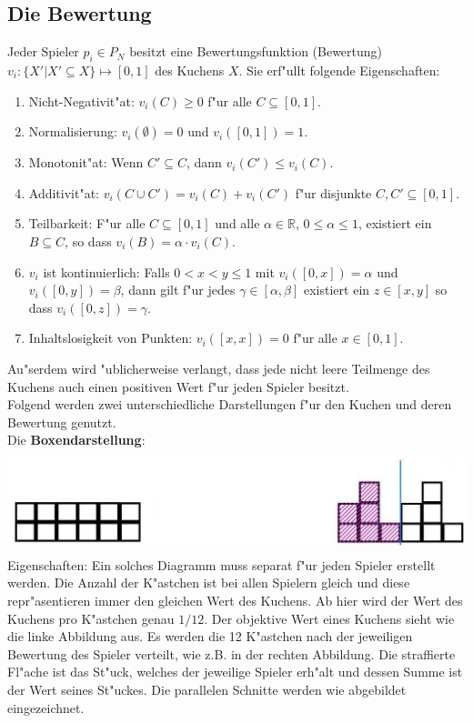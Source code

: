 \documentclass[11pt, a4paper, twoside]{article}
\numberwithin{equation}{section}
\begin{document}
\subsection{Die Bewertung} 
Jeder Spieler $p_i \in P_N$ besitzt eine Bewertungsfunktion (Bewertung) $v_i:\{X'|X'\subseteq X\}\mapsto [0,1]$ des Kuchens $X$. Sie erf"ullt folgende Eigenschaften:
\begin{enumerate}
\item Nicht-Negativit"at: $v_i(C)\geq 0$ f"ur alle $C\subseteq [0,1].$
\item Normalisierung: $v_i(\emptyset)=0$ und $v_i([0,1])=1.$
\item Monotonit"at: Wenn $C' \subseteq C$, dann $v_i(C') \leq v_i(C).$
\item Additivit"at: $v_i(C \cup C')=v_i(C)+v_i(C')$ f"ur disjunkte $C,C'\subseteq [0,1].$
\item Teilbarkeit: F"ur alle $C\subseteq [0,1]$ und alle $\alpha \in \mathbb{R}$, $0\leq \alpha \leq 1$, existiert ein $B\subseteq C$, so dass  $v_i(B)=\alpha \cdot v_i(C).$
\item  $v_i$ ist kontinuierlich: Falls $0<x<y\leq 1$ mit $v_i([0,x])=\alpha$ und $v_i([0,y])=\beta$, dann gilt f"ur jedes $\gamma \in [\alpha,\beta]$ existiert ein $z \in [x,y]$ so dass $v_i([0,z])=\gamma.$
\item Inhaltslosigkeit von Punkten:  $v_i([x,x])=0$ f"ur alle $x\in [0,1].$
\end{enumerate}
Au"serdem wird "ublicherweise verlangt, dass jede nicht leere Teilmenge des Kuchens auch einen positiven Wert f"ur jeden Spieler besitzt.\\
Folgend werden zwei unterschiedliche Darstellungen f"ur den Kuchen und deren Bewertung genutzt.\\
\newline
Die \textbf{Boxendarstellung}:\\
 \includegraphics[height=3cm]{cc1svv.jpg}\\
Eigenschaften: Ein solches Diagramm muss separat f"ur jeden Spieler erstellt werden. Die Anzahl der K"astchen ist bei allen Spielern gleich und diese repr"asentieren immer den gleichen Wert des Kuchens. Ab hier wird der Wert des Kuchens pro K"astchen genau $1/12$. Der objektive Wert eines Kuchens sieht wie die linke Abbildung aus. Es werden die 12 K"astchen nach der jeweiligen Bewertung des Spieler verteilt, wie z.B. in der rechten Abbildung. Die straffierte Fl"ache ist das St"uck, welches der jeweilige Spieler erh"alt und dessen Summe ist der Wert seines St"uckes. Die parallelen Schnitte werden wie abgebildet eingezeichnet.
\end{document}
